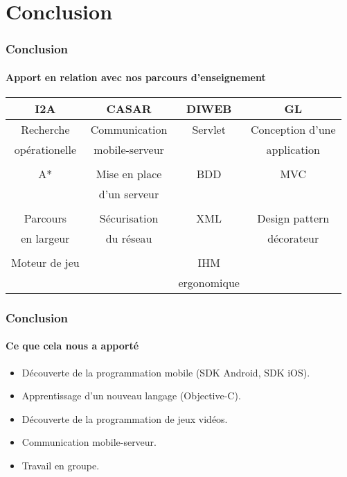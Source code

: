 \section{Conclusion}

\begin{frame}
\frametitle{Conclusion}
\framesubtitle{Apport en relation avec nos parcours d'enseignement}
\begin{tabular}{c|c|c|c}

I2A & CASAR & DIWEB & GL \\\hline
Recherche   &  Communication  &  Servlet  & Conception d'une  \\
 opérationelle  & mobile-serveur &   & application \\
                           &                              &                &                   \\
A* & Mise en place  & BDD & MVC \\
      &d'un serveur & & \\
                           &                              &                &                   \\
Parcours  &  Sécurisation   & XML  & Design pattern  \\
en largeur & du réseau & & décorateur \\

                           &                              &                &                   \\

Moteur de jeu & & IHM  & \\
           &           &        ergonomique        &        \\

\end{tabular}

\end{frame}



\begin{frame}
\frametitle{Conclusion}
\framesubtitle{Ce que cela nous a apporté}
\begin{itemize}
	\item Découverte de la programmation mobile (SDK Android, SDK iOS).
	\item Apprentissage d'un nouveau langage (Objective-C).
	\item Découverte de la programmation de jeux vidéos.
	\item Communication mobile-serveur.
	\item Travail en groupe.
\end{itemize}
\end{frame}
